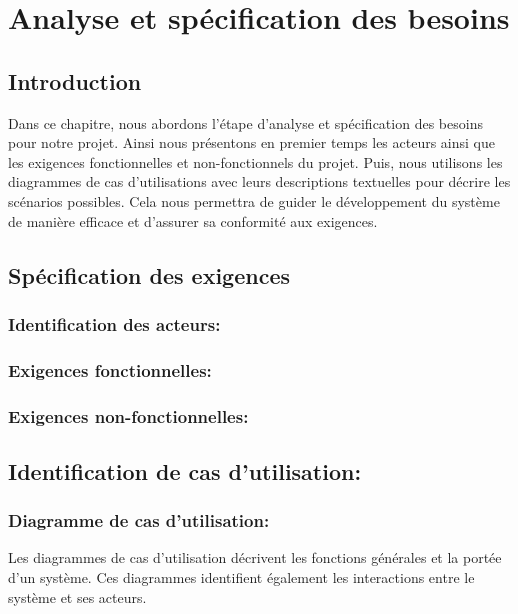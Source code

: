 \chapter{Analyse et spécification des besoins  }
\label{chap:Analyse et spécification des besoins }

\renewcommand{\arraystretch}{1.5}

\section*{Introduction}

Dans ce chapitre, nous abordons l’étape d’analyse et spécification des besoins pour notre projet. Ainsi nous présentons en premier temps les acteurs ainsi que les exigences fonctionnelles et non-fonctionnels du projet. Puis, nous utilisons les diagrammes de cas d’utilisations avec leurs descriptions textuelles pour décrire les scénarios possibles. Cela nous permettra de guider le développement du système de
manière efficace et d’assurer sa conformité aux exigences.

\pagebreak

\section{Spécification des exigences}

\subsection{Identification des acteurs:}
\subsection{Exigences fonctionnelles: }
\subsection{Exigences non-fonctionnelles:}

\section{Identification de cas d’utilisation:}

\subsection{Diagramme de cas d’utilisation:}

Les diagrammes de cas d'utilisation décrivent les fonctions générales et la portée
d'un système. Ces diagrammes identifient également les interactions entre le système et ses acteurs.


